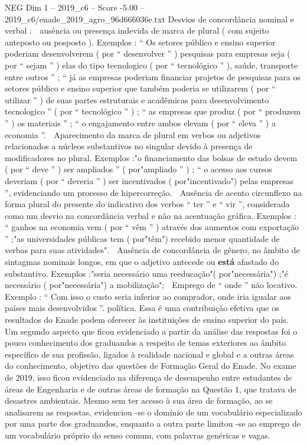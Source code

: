 \begin{textsample}{NEG Dim 1 – 2019\_c6 – Score -5.00 – 2019\_c6/enade\_2019\_agro\_96d666036e.txt}
Desvios de concordância nominal e verbal :  ausência ou presença indevida de marca de plural ( com sujeito anteposto ou posposto ).
Exemplos : “ Os setores público e ensino superior poderiam desenvolverem ( por “ desenvolver ” ) pesquisas para empresas seja ( por “ sejam ” ) elas do tipo tecnologico ( por “ tecnológico ” ), saúde, transporte entre outros ” ; “ já as empresas poderiam financiar projetos de pesquisas para os setores público e ensino superior que também poderia se utilizarem ( por “ utilizar ” ) de suas partes estruturais e acadêmicas para desenvolvimento tecnologico ” ( por “ tecnológico ” ) ; “ as empresas que produz ( por “ produzem ” ) os materiais ” ; “ o engajamento entre ambos elevam ( por “ eleva ” ) a economia ”.  Aparecimento da marca de plural em verbos ou adjetivos relacionados a núcleos substantivos no singular devido à presença de modificadores no plural.
Exemplos :"o financiamento das bolsas de estudo devem ( por “ deve ” ) ser ampliados ” ( por"ampliado ” ) ; “ o acesso aos cursos deveriam ( por “ deveria ” ) ser incentivados ( por"incentivado") pelas empresas ”, evidenciando um processo de hipercorreção.  Ausência de acento circunflexo na forma plural do presente do indicativo dos verbos “ ter ” e “ vir ”, considerada como um desvio na concordância verbal e não na acentuação gráfica.
Exemplos : “ ganhos na economia vem ( por “ vêm ” ) através dos aumentos com exportação ” ;"as universidades públicas tem ( por"têm") recebido menor quantidade de verbas para suas atividades".  Ausência de concordância de gênero, no âmbito de sintagmas nominais longos, em que o adjetivo antecede ou \textbf{está} afastado do substantivo.
Exemplos :"seria necessário uma reeducação"( por"necessária") ;"é necessário ( por"necessária") a mobilização";  Emprego de “ onde ” não locativo.
Exemplo : “ Com isso o custo seria inferior ao comprador, onde iria igualar aos países mais desenvolvidos ”. política.
Essa é uma contribuição efetiva que os resultados do Enade podem oferecer às instituições de ensino superior do país.
Um segundo aspecto que ficou evidenciado a partir da análise das respostas foi o pouco conhecimento dos graduandos a respeito de temas exteriores ao âmbito específico de sua profissão, ligados à realidade nacional e global e a outras áreas do conhecimento, objetivo das questões de Formação Geral do Enade.
No exame de 2019, isso ficou evidenciado na diferença de desempenho entre estudantes de áreas de Engenharia e de outras áreas de formação na Questão 1, que tratava de desastres ambientais.
Mesmo sem ter acesso à sua área de formação, ao se analisarem as respostas, evidenciou -se o domínio de um vocabulário especializado por uma parte dos graduandos, enquanto a outra parte limitou -se ao emprego de um vocabulário próprio do senso comum, com palavras genéricas e vagas.

\end{textsample}
